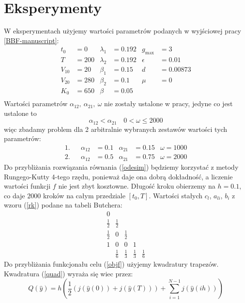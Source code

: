 \documentclass[11pt]{article}
\begin{document}
\section{Eksperymenty}
W eksperymentach użyjemy wartości parametrów podanych w wyjściowej pracy \ref{BBF-manuscript}:
\begin{align*}
  t_0 &= 0          & \lambda_1 &= 0.192 & g_{\max} &= 3    \\
  T &= 200          & \lambda_2 &= 0.192 & \epsilon &= 0.01 \\
  V_{10} &= 20      & \beta_1 &= 0.15    & d &= 0.00873     \\
  V_{20} &= 280     & \beta_2 &= 0.1     & \mu &= 0         \\
  K_0 &= 650        & \beta &= 0.05      &       &          \\
\end{align*}
Wartości parametrów $\alpha_{12},\ \alpha_{21},\ \omega$ nie zostały ustalone w pracy, jedyne co jest ustalone to
\[ \alpha_{12} < \alpha_{21}\quad 0 < \omega \le 2000 \]
więc zbadamy problem dla 2 arbitralnie wybranych zestawów wartości tych parametrów:
\begin{align*}
1.& &  \alpha_{12} &= 0.1 & \alpha_{21} &= 0.15 & \omega = 1000
\end{align*}
\begin{align*}
2.& &  \alpha_{12} &= 0.5 & \alpha_{21} &= 0.75 & \omega = 2000
\end{align*}
Do przybliżania rozwiązania równania (\ref{odesim}) będziemy korzystać z metody Rungego-Kutty 4-tego rzędu, ponieważ daje ona dobrą dokładność, a liczenie wartości funkcji $f$ nie jest zbyt kosztowne. Długość kroku obierzemy na $h = 0.1$, co daje $2000$ kroków na całym przedziale $[t_0, T]$. Wartości stałych $c_l$, $a_{li}$, $b_i$ z wzoru (\ref{rk}) podane na tabeli Butchera:
\begin{equation}\label{butcher}
  \begin{array}
    {c|cccc}
    0\\
    \frac{1}{2} & \frac{1}{2}\\
    \frac{1}{2} &0 &\frac{1}{2} \\
    1& 0& 0& 1\\
    \hline{}
    & \frac{1}{6} &\frac{1}{3} &\frac{1}{3} &\frac{1}{6} 
  \end{array}
\end{equation}
Do przybliżania funkcjonału celu (\ref{objf}) użyjemy kwadratury trapezów. Kwadratura (\ref{quad}) wyraża się wiec przez:
\begin{equation} \label{trapezoidal}
  Q(\hat{y}) = h\left(\frac{1}{2}(j(\hat{y}(0)) + j(\hat{y}(T))) + \sum_{i=1}^{N-1} j(\hat{y}(ih))\right)
\end{equation}
\end{document}
